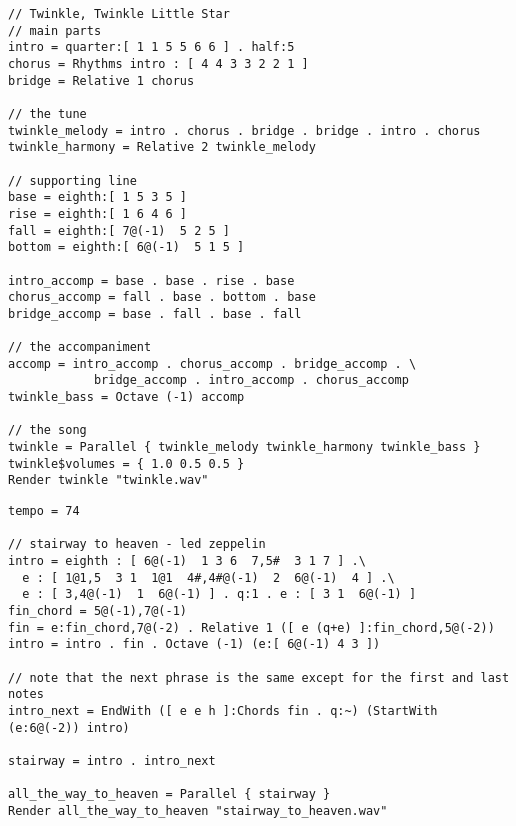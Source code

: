\documentclass{plt}
\begin{document}
\begin{frame}[fragile]
\fontsize{7.5pt}{7.5pt}\selectfont
\begin{verbatim}
// Twinkle, Twinkle Little Star
// main parts
intro = quarter:[ 1 1 5 5 6 6 ] . half:5
chorus = Rhythms intro : [ 4 4 3 3 2 2 1 ]
bridge = Relative 1 chorus

// the tune
twinkle_melody = intro . chorus . bridge . bridge . intro . chorus
twinkle_harmony = Relative 2 twinkle_melody

// supporting line
base = eighth:[ 1 5 3 5 ]
rise = eighth:[ 1 6 4 6 ]
fall = eighth:[ 7@(-1)  5 2 5 ]
bottom = eighth:[ 6@(-1)  5 1 5 ]

intro_accomp = base . base . rise . base
chorus_accomp = fall . base . bottom . base
bridge_accomp = base . fall . base . fall

// the accompaniment
accomp = intro_accomp . chorus_accomp . bridge_accomp . \
            bridge_accomp . intro_accomp . chorus_accomp
twinkle_bass = Octave (-1) accomp

// the song
twinkle = Parallel { twinkle_melody twinkle_harmony twinkle_bass }
twinkle$volumes = { 1.0 0.5 0.5 }
Render twinkle "twinkle.wav"
\end{verbatim}
\end{frame}

\begin{frame}[fragile]
\fontsize{8pt}{8pt}\selectfont
\begin{verbatim}
tempo = 74

// stairway to heaven - led zeppelin
intro = eighth : [ 6@(-1)  1 3 6  7,5#  3 1 7 ] .\
  e : [ 1@1,5  3 1  1@1  4#,4#@(-1)  2  6@(-1)  4 ] .\
  e : [ 3,4@(-1)  1  6@(-1) ] . q:1 . e : [ 3 1  6@(-1) ]
fin_chord = 5@(-1),7@(-1)
fin = e:fin_chord,7@(-2) . Relative 1 ([ e (q+e) ]:fin_chord,5@(-2))
intro = intro . fin . Octave (-1) (e:[ 6@(-1) 4 3 ])

// note that the next phrase is the same except for the first and last notes
intro_next = EndWith ([ e e h ]:Chords fin . q:~) (StartWith (e:6@(-2)) intro)

stairway = intro . intro_next

all_the_way_to_heaven = Parallel { stairway }
Render all_the_way_to_heaven "stairway_to_heaven.wav"
\end{verbatim}
\end{frame}
\end{document}
